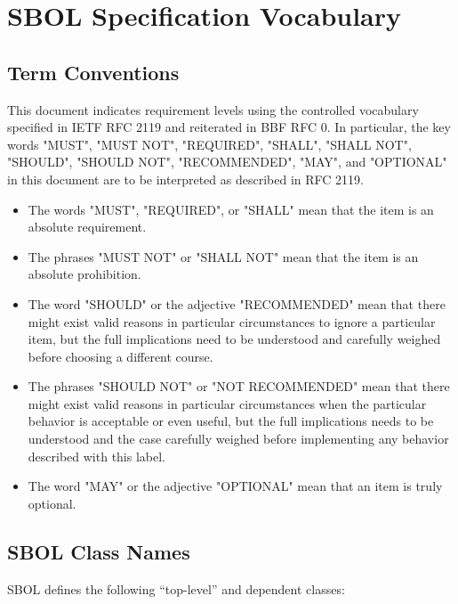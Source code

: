 \section{SBOL Specification Vocabulary}

\subsection{Term Conventions}

This document indicates requirement levels using the controlled vocabulary specified in IETF RFC 2119 and reiterated in BBF RFC 0.
In particular, the key words "MUST", "MUST NOT", "REQUIRED", "SHALL", "SHALL NOT", "SHOULD", "SHOULD NOT", "RECOMMENDED", "MAY", and "OPTIONAL" in this document are to be interpreted as described in RFC 2119.

\begin{itemize}
\item The words "MUST", "REQUIRED", or "SHALL" mean that the item is an absolute requirement.
\item The phrases "MUST NOT" or "SHALL NOT" mean that the item is an absolute prohibition.
\item The word "SHOULD" or the adjective "RECOMMENDED" mean that there might exist valid reasons in particular circumstances to ignore a particular item, but the full implications need to be understood and carefully weighed before choosing a different course.
\item The phrases "SHOULD NOT" or "NOT RECOMMENDED" mean that there might exist valid reasons in particular circumstances when the particular behavior is acceptable or even useful, but the full implications needs to be understood and the case carefully weighed before implementing any behavior described with this label.
\item The word "MAY" or the adjective "OPTIONAL" mean that an item is truly optional.
\end{itemize}

\subsection{SBOL Class Names}

SBOL defines the following ``top-level'' and dependent classes:

